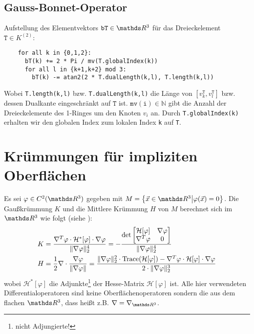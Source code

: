  \subsection{Gauss-Bonnet-Operator}
  \label{subsecAlgoGaussBonnet}
    Aufstellung des Elementvektors \( \mathtt{bT}\in\R^{3} \) für das Dreieckelement
    \( \mathtt{T}\in K^{(2)} \):
    \begin{verbatim}
    for all k in {0,1,2}:
      bT(k) += 2 * Pi / mv(T.globalIndex(k))
      for all l in {k+1,k+2} mod 3:
        bT(k) -= atan2(2 * T.dualLength(k,l), T.length(k,l))
    \end{verbatim}
    Wobei \texttt{T.length(k,l)} bzw. \texttt{T.dualLength(k,l)} die Länge von
    \( \left[ v^{\mathtt{T}}_{k} , v^{\mathtt{T}}_{l} \right] \) bzw. dessen Dualkante eingeschränkt auf \(
    \mathtt{T} \) ist. 
    \( \mathtt{mv(i)}\in\mathds{N} \) gibt die Anzahl der Dreieckelemente des 1-Ringes um den Knoten \( v_{i} \) an.
    Durch \texttt{T.globalIndex(k)} erhalten wir den globalen Index zum lokalen Index \texttt{k} auf \texttt{T}.

\section{Krümmungen für impliziten Oberflächen}

  Es sei \( \varphi\in C^{2}(\R^{3}) \) gegeben mit \( M = \left\{ \vec{x}\in\R^{3} \middle| \varphi(\vec{x}) = 0 \right\} \).
  Die Gaußkrümmung \( K \) und die Mittlere Krümmung \( H \) von \( M \) berechnet sich im \( \R^{3} \) wie folgt (siehe \cite{CurvatureFormulas}):
  \begin{align}
    K &= \frac{\nabla^{T}\varphi \cdot \mathcal{H}^{*}[\varphi] \cdot \nabla\varphi}{ \|\nabla\varphi\|_{2}^{4}}
                 = - \frac{\det \begin{bmatrix} \mathcal{H}[\varphi] & \nabla\varphi \\ \nabla^{T}\varphi & 0 \end{bmatrix}}{\|\nabla\varphi\|_{2}^{4}} \\
    H &= \frac{1}{2}\nabla \cdot \frac{\nabla\varphi}{\|\nabla\varphi\|}
          = \frac{\|\nabla\varphi\|_{2}^{2}\cdot\text{Trace}(\mathcal{H}[\varphi]) - \nabla^{T}\varphi \cdot \mathcal{H}[\varphi] \cdot \nabla\varphi }
                        {2\cdot\|\nabla\varphi\|_{2}^{3}}
  \end{align}
  wobei \( \mathcal{H}^{*}[\varphi] \) die Adjunkte\footnote{nicht Adjungierte!} der Hesse-Matrix \( \mathcal{H}[\varphi] \) ist.
  Alle hier verwendeten Differentialoperatoren sind keine Oberflächenoperatoren sondern die aus dem flachen \( \R^{3} \), dass heißt z.B.
  \( \nabla = \nabla_{\R^{3}} \).


